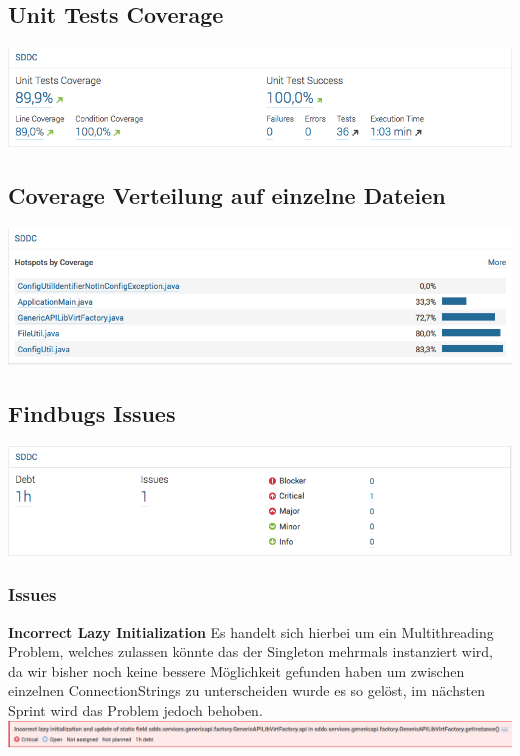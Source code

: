 \subsection{Unit Tests Coverage}
\includegraphics[width=\textwidth]{./10_Protokolle/04_Testprotokoll/images/Sprint2/coverage}

\subsection{Coverage Verteilung auf einzelne Dateien}
\includegraphics[width=\textwidth]{./10_Protokolle/04_Testprotokoll/images/Sprint2/coverageperfile}

\subsection{Findbugs Issues}
\includegraphics[width=\textwidth]{./10_Protokolle/04_Testprotokoll/images/Sprint2/issues}
\subsubsection{Issues}
\textbf{Incorrect Lazy Initialization}
\newline
Es handelt sich hierbei um ein Multithreading Problem, welches zulassen könnte 
das der Singleton mehrmals instanziert wird, da wir bisher noch keine bessere 
Möglichkeit gefunden haben um zwischen einzelnen ConnectionStrings zu 
unterscheiden wurde es so gelöst, im nächsten Sprint wird das Problem jedoch behoben.
\newline
\includegraphics[width=\textwidth]{./10_Protokolle/04_Testprotokoll/images/Sprint2/lazy}

